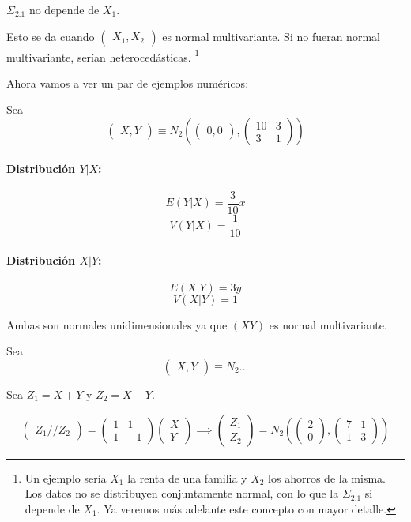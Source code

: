 \documentclass[nochap]{apuntes}
\begin{document}
\begin{defn}[Homocedástico]
$Σ_{2.1}$ no depende de $X_1$.

Esto se da cuando $\begin{pmatrix}X_1,X_2\end{pmatrix}$ es normal multivariante. Si no fueran normal multivariante, serían heterocedásticas. \footnote{Un ejemplo sería $X_1$ la renta de una familia y $X_2$ los ahorros de la misma. Los datos no se distribuyen conjuntamente normal, con lo que la $Σ_{2.1}$ si depende de $X_1$. Ya veremos más adelante este concepto con mayor detalle.}
\end{defn}


\begin{example}

Ahora vamos a ver un par de ejemplos numéricos:

Sea \[\begin{pmatrix}X,Y\end{pmatrix} \equiv N_2 \left( \begin{pmatrix}0,0\end{pmatrix}, \begin{pmatrix}10&3\\3&1\end{pmatrix} \right)\]

\paragraph{Distribución $Y|X$:}

\[E(Y|X) = \frac{3}{10}x\]
\[V(Y|X) = \frac{1}{10}\]

\paragraph{Distribución $X|Y$:}

\[E(X|Y) = 3y\]
\[V(X|Y) = 1\]

Ambas son normales unidimensionales ya que $(X Y)$ es normal multivariante.

Sea \[\begin{pmatrix}X,Y\end{pmatrix} \equiv N_2 ...\]

Sea $Z_1 = X+Y$ y $Z_2 = X-Y$.

\[
\begin{pmatrix}Z_1//Z_2\end{pmatrix} = \begin{pmatrix}1&1\\1&-1\end{pmatrix}\begin{pmatrix}X\\Y\end{pmatrix} \implies \begin{pmatrix}Z_1\\Z_2\end{pmatrix} = N_2\left(\begin{pmatrix}2\\0\end{pmatrix},\begin{pmatrix}7&1\\1&3\end{pmatrix}\right)
\]


\end{example}
\end{document}

